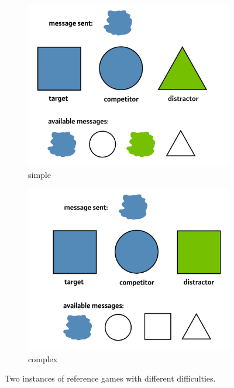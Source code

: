 \begin{figure}
\centering
\begin{subfigure}{.5\textwidth}
  \centering
  \includegraphics[width=1\linewidth]{images/simple.png}
  \caption{simple}
  \label{fig:simple}
\end{subfigure}%
\begin{subfigure}{.5\textwidth}
  \centering
  \includegraphics[width=1\linewidth]{images/complex.png}
  \caption{complex}
  \label{fig:complex}
\end{subfigure}
\caption{Two instances of reference games with different difficulties. }
\label{fig:simple_complex}
\end{figure}

